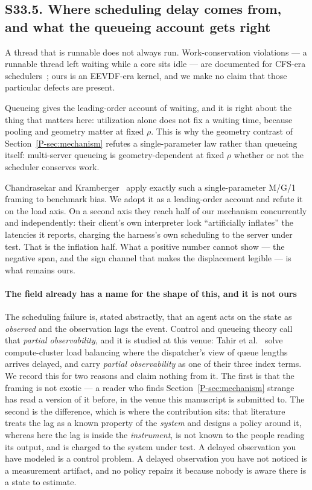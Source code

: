\documentclass[10pt,journal,onecolumn]{IEEEtran}
\newcommand{\mainModeA}{\ref{P-sec:mechanism}}             %
\begin{document}
\subsection{S33.5. Where scheduling delay comes from, and what the queueing account gets right}

A thread that is runnable does not always run. Work-conservation violations --- a runnable
thread left waiting while a core sits idle --- are documented for CFS-era
schedulers~\cite{lozi2016wastedcores}; ours is an EEVDF-era kernel, and we make no claim that
those particular defects are present.

Queueing gives the leading-order account of waiting, and it is right about the thing that
matters here: utilization alone does not fix a waiting time, because pooling and geometry
matter at fixed $\rho$. This is why the geometry contrast of Section~\mainModeA{} refutes a
single-parameter law rather than queueing itself: multi-server queueing is geometry-dependent
at fixed $\rho$ whether or not the scheduler conserves work.

Chandrasekar and Kramberger~\cite{chandrasekar2026bias} apply exactly such a single-parameter
M/G/1 framing to benchmark bias. We adopt it as a leading-order account and refute it on the
load axis. On a second axis they reach half of our mechanism concurrently and independently:
their client's own interpreter lock ``artificially inflates'' the latencies it reports,
charging the harness's own scheduling to the server under test. That is the inflation half.
What a positive number cannot show --- the negative span, and the sign channel that makes the
displacement legible --- is what remains ours.

\paragraph{The field already has a name for the shape of this, and it is not ours}
The scheduling failure is, stated abstractly, that an agent acts on the state as \emph{observed}
and the observation lags the event. Control and queueing theory call that \emph{partial
observability}, and it is studied at this venue: Tahir et al.~\cite{tahir2022delayed} solve
compute-cluster load balancing where the dispatcher's view of queue lengths arrives delayed, and
carry \emph{partial observability} as one of their three index terms. We record this for two
reasons and claim nothing from it. The first is that the framing is not exotic --- a reader who
finds Section~\mainModeA{} strange has read a version of it before, in the venue this manuscript
is submitted to. The second is the difference, which is where the contribution sits: that
literature treats the lag as a known property of the \emph{system} and designs a policy around
it, whereas here the lag is inside the \emph{instrument}, is not known to the people reading its
output, and is charged to the system under test. A delayed observation you have modeled is a
control problem. A delayed observation you have not noticed is a measurement artifact, and no
policy repairs it because nobody is aware there is a state to estimate.
\end{document}
